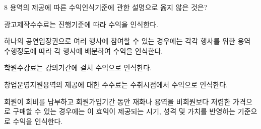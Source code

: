 \begin{question}{8}
용역의 제공에 따른 수익인식기준에 관한 설명으로 옳지 않은 것은?
\begin{choices}
  \item 광고제작수수료는 진행기준에 따라 수익을 인식한다.
  \item 하나의 공연입장권으로 여러 행사에 참여할 수 있는 경우에는 각각 행사를 위한 용역 수행정도에 따라 각 행사에 배분하여 수익을 인식한다.
  \item 학원수강료는 강의기간에 걸쳐 수익으로 인식한다.
  \item 창업운영지원용역의 제공에 대한 수수료는 수취시점에서 수익으로 인식한다.
  \item 회원이 회비를 납부하고 회원가입기간 동안 재화나 용역을 비회원보다 저렴한 가격으로 구매할 수 있는 경우에는 이 효익이 제공되는 시기, 성격 및 가치를 반영하는 기준으로 수익을 인식한다.
\end{choices}
\end{question}
